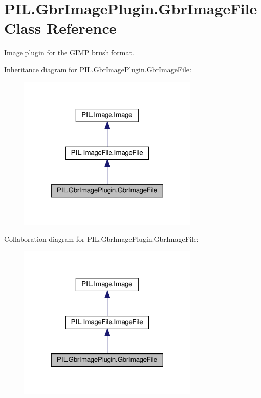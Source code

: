 \hypertarget{classPIL_1_1GbrImagePlugin_1_1GbrImageFile}{}\section{P\+I\+L.\+Gbr\+Image\+Plugin.\+Gbr\+Image\+File Class Reference}
\label{classPIL_1_1GbrImagePlugin_1_1GbrImageFile}


\hyperlink{namespacePIL_1_1Image}{Image} plugin for the G\+I\+MP brush format.  




Inheritance diagram for P\+I\+L.\+Gbr\+Image\+Plugin.\+Gbr\+Image\+File\+:
\nopagebreak
\begin{figure}[H]
\begin{center}
\leavevmode
\includegraphics[width=246pt]{classPIL_1_1GbrImagePlugin_1_1GbrImageFile__inherit__graph}
\end{center}
\end{figure}


Collaboration diagram for P\+I\+L.\+Gbr\+Image\+Plugin.\+Gbr\+Image\+File\+:
\nopagebreak
\begin{figure}[H]
\begin{center}
\leavevmode
\includegraphics[width=246pt]{classPIL_1_1GbrImagePlugin_1_1GbrImageFile__coll__graph}
\end{center}
\end{figure}
